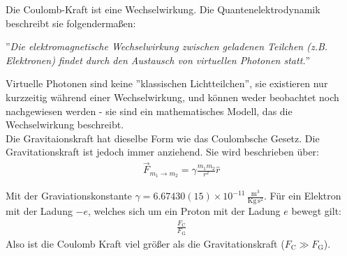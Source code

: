 \documentclass{article}
\begin{document}
\noindent Die Coulomb-Kraft ist eine Wechselwirkung. 
Die Quantenelektrodynamik beschreibt sie folgendermaßen:
\begin{center}
    ''\textit{Die elektromagnetische Wechselwirkung zwischen geladenen Teilchen (z.B. Elektronen)
    findet durch den Austausch von virtuellen Photonen statt.}''
\end{center}
Virtuelle Photonen sind keine ''klassischen Lichtteilchen'', sie existieren nur kurzzeitig während einer Wechselwirkung,
und können weder beobachtet noch nachgewiesen werden - sie sind ein mathematisches Modell, das die Wechselwirkung beschreibt.\\

\noindent Die Gravitaionskraft hat dieselbe Form wie das Coulombsche Gesetz. Die Gravitationskraft ist jedoch immer anziehend.
Sie wird beschrieben über: 
\begin{align}
    \vec{F}_{m_1\rightarrow m_2}=\gamma\frac{m_1m_2}{r^2}\hat{r}
\end{align}

Mit der Graviationskonstante $\gamma=6.67430(15)\times 10^{-11}\,\frac{\mathrm{m}^3}{\mathrm{Kg\,s^2}}$.
Für ein Elektron mit der Ladung $-e$, welches sich um ein Proton mit der Ladung $e$ bewegt gilt:
\begin{align}
    \frac{F_\mathrm{C}}{F_\mathrm{G}}
\end{align}
Also ist die Coulomb Kraft viel größer als die Gravitationskraft ($F_\mathrm{C}\gg F_\mathrm{G}$).
\end{document}
